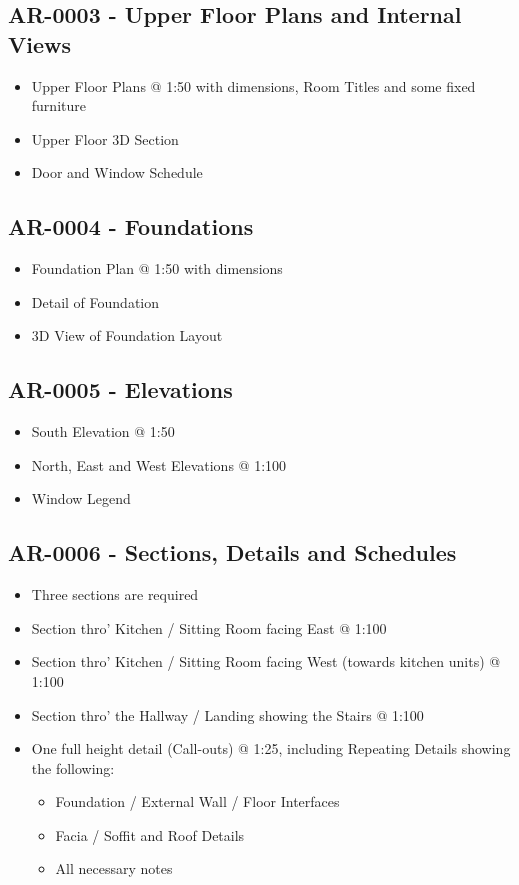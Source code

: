 \subsection*{AR-0003 - Upper Floor Plans and Internal Views}
\begin{itemize}
	\item Upper Floor Plans @ 1:50 with dimensions, Room Titles and some fixed furniture
	\item Upper Floor 3D Section
	\item Door and Window Schedule
\end{itemize}


\subsection*{AR-0004 - Foundations}
\begin{itemize}
	\item Foundation Plan @ 1:50 with dimensions
	\item Detail of Foundation
	\item 3D View of Foundation Layout
\end{itemize}



\subsection*{AR-0005 - Elevations}
\begin{itemize}
	\item South Elevation @ 1:50
	\item North, East and West Elevations @ 1:100
	\item Window Legend
\end{itemize}

\subsection*{AR-0006 - Sections, Details and Schedules}
\begin{itemize}
	\item Three sections are required
	\item Section thro' Kitchen / Sitting Room facing East @ 1:100
	\item Section thro' Kitchen / Sitting Room facing West (towards kitchen units) @ 1:100
	\item Section thro' the Hallway / Landing showing the Stairs @ 1:100
	\item One full height detail (Call-outs) @ 1:25, including Repeating Details showing the following:
	\begin{itemize}
		\item Foundation / External Wall / Floor Interfaces
		\item Facia / Soffit and Roof Details
		\item All necessary notes
	\end{itemize} 
\end{itemize}


